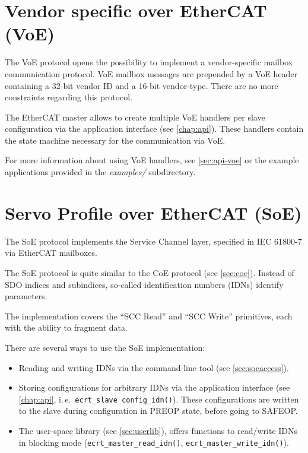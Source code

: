 \documentclass[a4paper,12pt,BCOR=6mm,bibtotoc,idxtotoc]{scrbook}
\begin{document}
\section{Vendor specific over EtherCAT (VoE)}
\label{sec:voe}

The VoE protocol opens the possibility to implement a vendor-specific mailbox
communication protocol. VoE mailbox messages are prepended by a VoE header
containing a 32-bit vendor ID and a 16-bit vendor-type. There are no more
constraints regarding this protocol.

The EtherCAT master allows to create multiple VoE handlers per slave
configuration via the application interface (see \autoref{chap:api}). These
handlers contain the state machine necessary for the communication via VoE.

For more information about using VoE handlers, see \autoref{sec:api-voe} or
the example applications provided in the \textit{examples/} subdirectory.


\section{Servo Profile over EtherCAT (SoE)}
\label{sec:soe}

The SoE protocol implements the Service Channel layer, specified in IEC
61800-7 \cite{soespec} via EtherCAT mailboxes.

The SoE protocol is quite similar to the CoE protocol (see
\autoref{sec:coe}). Instead of SDO indices and subindices, so-called
identification numbers (IDNs) identify parameters.

The implementation covers the ``SCC Read'' and ``SCC Write'' primitives, each
with the ability to fragment data.

There are several ways to use the SoE implementation:

\begin{itemize}

\item Reading and writing IDNs via the command-line tool (see
\autoref{sec:soeaccess}).

\item Storing configurations for arbitrary IDNs via the application interface
(see \autoref{chap:api}, i.\,e.~\lstinline+ecrt_slave_config_idn()+). These
configurations are written to the slave during configuration in PREOP state,
before going to SAFEOP.

\item The user-space library (see \autoref{sec:userlib}), offers functions to
read/write IDNs in blocking mode (\lstinline+ecrt_master_read_idn()+,
\lstinline+ecrt_master_write_idn()+).

\end{itemize}
\end{document}
